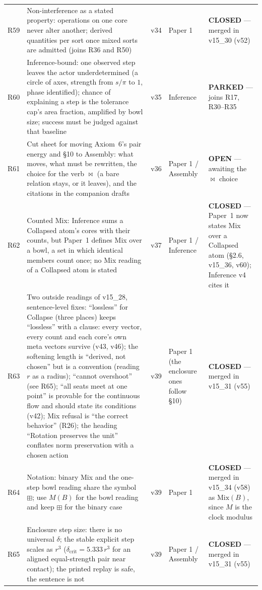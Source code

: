 \documentclass[11pt]{article}
\begin{document}
\begin{longtable}{@{}l R{4.9cm} R{1.5cm} R{2.3cm} R{4.4cm}@{}}
R59 & Non-interference as a stated property: operations on one core never alter another; derived quantities per sort once mixed sorts are admitted (joins R36 and R50) & v34 & Paper 1 & \textbf{CLOSED} --- merged in v15\_30 (v52) \\
R60 & Inference-bound: one observed step leaves the actor underdetermined (a circle of axes, strength from $s/\pi$ to $1$, phase identified); chance of explaining a step is the tolerance cap's area fraction, amplified by bowl size; success must be judged against that baseline & v35 & Inference & \textbf{PARKED} --- joins R17, R30--R35 \\
R61 & Cut sheet for moving Axiom~6's pair energy and \S10 to Assembly: what moves, what must be rewritten, the choice for the verb $\bowtie$ (a bare relation stays, or it leaves), and the citations in the companion drafts & v36 & Paper 1 / Assembly & \textbf{OPEN} --- awaiting the $\bowtie$ choice \\
R62 & Counted Mix: Inference sums a Collapsed atom's cores with their counts, but Paper~1 defines Mix over a bowl, a set in which identical members count once; no Mix reading of a Collapsed atom is stated & v37 & Paper 1 / Inference & \textbf{CLOSED} --- Paper~1 now states Mix over a Collapsed atom (\S2.6, v15\_36, v60); Inference v4 cites it \\
R63 & Two outside readings of v15\_28, sentence-level fixes: ``lossless'' for Collapse (three places) keeps ``lossless'' with a clause: every vector, every count and each core's own meta vectors survive (v43, v46); the softening length is ``derived, not chosen'' but is a convention (reading $r$ as a radius); ``cannot overshoot'' (see R65); ``all seats meet at one point'' is provable for the continuous flow and should state its conditions (v42); Mix refusal is ``the correct behavior'' (R26); the heading ``Rotation preserves the unit'' conflates norm preservation with a chosen action & v39 & Paper 1 (the enclosure ones follow \S10) & \textbf{CLOSED} --- merged in v15\_31 (v55) \\
R64 & Notation: binary Mix and the one-step bowl reading share the symbol $\boxplus$; use $M(B)$ for the bowl reading and keep $\boxplus$ for the binary case & v39 & Paper 1 & \textbf{CLOSED} --- merged in v15\_34 (v58) as $\mathrm{Mix}(B)$, since $M$ is the clock modulus \\
R65 & Enclosure step size: there is no universal $\delta$; the stable explicit step scales as $r^3$ ($\delta_{\text{crit}}=5.333\,r^3$ for an aligned equal-strength pair near contact); the printed replay is safe, the sentence is not & v39 & Paper 1 / Assembly & \textbf{CLOSED} --- merged in v15\_31 (v55) \\

\end{longtable}
\end{document}

